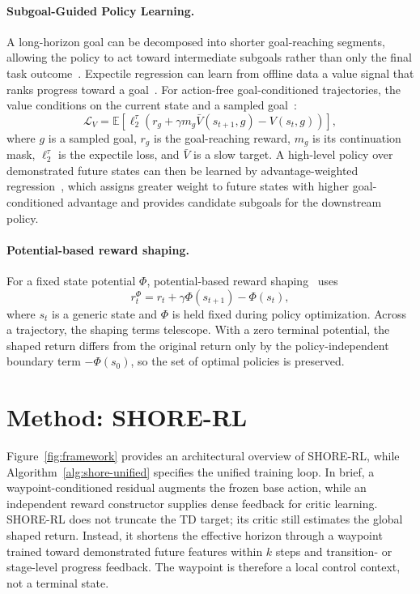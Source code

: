 \documentclass[letterpaper]{article} %
\begin{document}
\paragraph{Subgoal-Guided Policy Learning.}
A long-horizon goal can be decomposed into shorter goal-reaching segments,
allowing the policy to act toward intermediate subgoals rather than only the
final task outcome~\cite{sutton1999between,nachum2018hiro}. Expectile
regression can learn from offline data a value signal that ranks progress
toward a goal~\cite{kostrikov2022iql}. For action-free goal-conditioned
trajectories, the value conditions on the current state and a sampled
goal~\cite{park2023hiql}:
\begin{equation}
\mathcal L_V
=
\mathbb E\!\left[
\ell_2^\tau\!\left(
 r_g+\gamma m_g\bar V(s_{t+1},g)-V(s_t,g)
\right)\right],
\label{eq:goal-value-background}
\end{equation}
where $g$ is a sampled goal, $r_g$ is the goal-reaching reward, $m_g$ is its
continuation mask, $\ell_2^\tau$ is the expectile loss, and $\bar V$ is a
slow target. A high-level policy over demonstrated future states can then be
learned by advantage-weighted regression~\cite{peng2019awr,park2023hiql},
which assigns greater weight to future states with higher goal-conditioned
advantage and provides candidate subgoals for the downstream policy.

\paragraph{Potential-based reward shaping.}
For a fixed state potential $\Phi$, potential-based reward
shaping~\cite{ng1999policy} uses
\begin{equation}
 r_t^\Phi=r_t+\gamma\Phi(s_{t+1})-\Phi(s_t),
\label{eq:pbs-background}
\end{equation}
where $s_t$ is a generic state and $\Phi$ is held fixed during policy
optimization. Across a trajectory, the shaping terms telescope. With a zero
terminal potential, the shaped return differs from the original return only
by the policy-independent boundary term $-\Phi(s_0)$, so the set of optimal
policies is preserved.

\section{Method: SHORE-RL}
Figure~\ref{fig:framework} provides an architectural overview of SHORE-RL,
while Algorithm~\ref{alg:shore-unified} specifies the unified training loop.
In brief, a waypoint-conditioned residual augments the frozen base action,
while an independent reward constructor supplies dense feedback for critic
learning.
SHORE-RL does not truncate the TD target; its critic still estimates the global shaped return. Instead, it shortens the effective horizon through a waypoint trained toward demonstrated future features within $k$ steps and transition- or stage-level progress feedback. The waypoint is therefore a local control context, not a terminal state.
\end{document}

